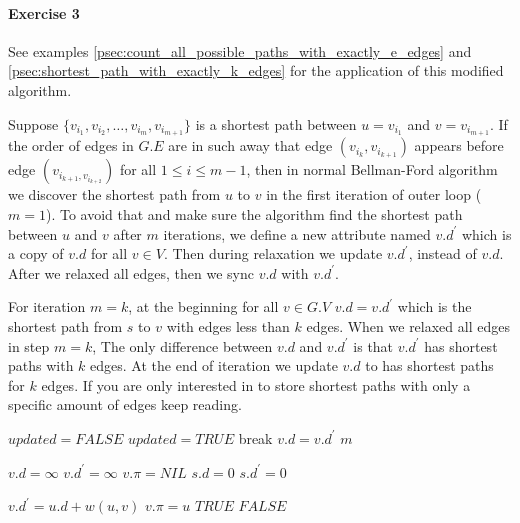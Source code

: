 \documentclass{book}
\begin{document}
	\paragraph{Exercise 3}
	See examples \ref{psec:count_all_possible_paths_with_exactly_e_edges} and \ref{psec:shortest_path_with_exactly_k_edges} for the application of this modified algorithm.
	\par Suppose $\{v_{i_1}, v_{i_2}, \dots, v_{i_m}, v_{i_{m + 1}}\}$ is a shortest path between $u = v_{i_1}$ and $v = v_{i_{m + 1}}$. If the order of edges in $G.E$ are in such away that edge $(v_{i_k}, v_{i_{k + 1}})$ appears before edge $(v_{i_{k + 1}, v_{i_{k + 2}}})$ for all $1 \le i \le m - 1$, then in normal Bellman-Ford algorithm we discover the shortest path from $u$ to $v$ in the first iteration of outer loop ($m = 1$). To avoid that and make sure the algorithm find the shortest path between $u$ and $v$ after $m$ iterations, we define a new attribute named $v.d^\prime$ which is a copy of $v.d$ for all $v \in V$. Then during relaxation we update $v.d^\prime$, instead of $v.d$. After we relaxed all edges, then we sync $v.d$ with $v.d^\prime$.
	\par For iteration $m=k$, at the beginning for all $v \in G.V$ $v.d = v.d^\prime$ which is the shortest path from $s$ to $v$ with edges less than $k$ edges. When we relaxed all edges in step $m = k$, The only difference between $v.d$ and $v.d^\prime$ is that $v.d^\prime$ has shortest paths with $k$ edges. At the end of iteration we update $v.d$ to has shortest paths for $k$ edges. If you are only interested in to store shortest paths with only a specific amount of edges keep reading.
	
	\begin{algorithm*}[h!]
		\begin{algorithmic}[1]
				\State {}
				 
					\State $updated = FALSE$
							\State $updated = TRUE$
						\EndIf
					\EndFor
						\State break
					\EndIf
						\State $v.d = v.d^\prime$
					\EndFor
				\EndFor
				\State \Return $m$
			\EndFunction
		\end{algorithmic}
			\begin{algorithmic}[1]
						\State $v.d = \infty$
						\State $v.d^\prime = \infty$
						\State $v.\pi = NIL$
					\EndFor
					\State $s.d = 0$
					\State $s.d^\prime = 0$
				\EndFunction
			\end{algorithmic}		
		
			\begin{algorithmic}[1]
						\State $v.d^\prime = u.d + w(u, v)$
						\State $v.\pi = u$
						\State \Return $TRUE$
					\Else
						\State \Return $FALSE$
					\EndIf
			\EndFunction
		\end{algorithmic}
	\end{algorithm*}
	\FloatBarrier
	
\end{document}
